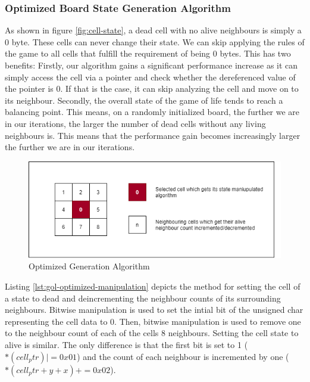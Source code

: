 \documentclass[a4paper,german,12pt,twoside=false]{scrartcl} %
\begin{document}
\subsubsection{Optimized Board State Generation Algorithm}

As shown in figure \ref{fig:cell-state}, a dead cell with no alive neighbours is simply a 0 byte. These cells can never change their state. We can skip applying the rules of the game to all cells that fulfill the requirement of being 0 bytes. This has two benefits: Firstly, our algorithm gains a significant performance increase as it can simply access the cell via a pointer and check whether the dereferenced value of the pointer is 0. If that is the case, it can skip analyzing the cell and move on to its neighbour. Secondly, the overall state of the game of life tends to reach a balancing point. This means, on a randomly initialized board, the further we are in our iterations, the larger the number of dead cells without any living neighbours is. This means that the performance gain becomes increasingly larger the further we are in our iterations. \breakln

\begin{figure}[tbh!]
	\centering
	\includegraphics[width=16cm]{imgs/cell-algo.png}
	\caption{Optimized Generation Algorithm}
	\label{fig:cell-algo}
\end{figure}

Listing \ref{lst:gol-optimized-manipulation} depicts the method for setting the cell of a state to dead and deincrementing the neighbour counts of its surrounding neighbours. Bitwise manipulation is used to set the intial bit of the unsigned char representing the cell data to 0. Then, bitwise manipulation is used to remove one to the neighbour count of each of the cells 8 neighbours. Setting the cell state to alive is similar. The only difference is that the first bit is set to 1 ($*(cell_ptr) |= 0x01$)  and the count of each neighbour is incremented by one ($*(cell_ptr + y + x) += 0x02$).
\end{document}
